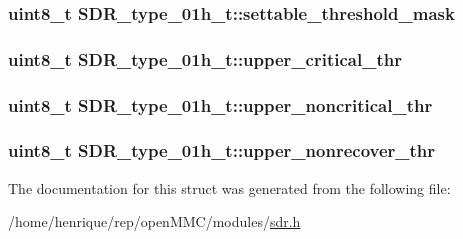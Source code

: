 \hypertarget{structSDR__type__01h__t_ac5b87fdae3ca9a1e52938e333b2a3eb7}{
\subsubsection[{settable\-\_\-threshold\-\_\-mask}]{\setlength{\rightskip}{0pt plus 5cm}uint8\-\_\-t S\-D\-R\-\_\-type\-\_\-01h\-\_\-t\-::settable\-\_\-threshold\-\_\-mask}}\label{structSDR__type__01h__t_ac5b87fdae3ca9a1e52938e333b2a3eb7}
\hypertarget{structSDR__type__01h__t_ac3ebe764adbc5470f3fccb7ea4ae3f57}{
\subsubsection[{upper\-\_\-critical\-\_\-thr}]{\setlength{\rightskip}{0pt plus 5cm}uint8\-\_\-t S\-D\-R\-\_\-type\-\_\-01h\-\_\-t\-::upper\-\_\-critical\-\_\-thr}}\label{structSDR__type__01h__t_ac3ebe764adbc5470f3fccb7ea4ae3f57}
\hypertarget{structSDR__type__01h__t_aaca8ed979cdd5f27242eb009a23e0ea6}{
\subsubsection[{upper\-\_\-noncritical\-\_\-thr}]{\setlength{\rightskip}{0pt plus 5cm}uint8\-\_\-t S\-D\-R\-\_\-type\-\_\-01h\-\_\-t\-::upper\-\_\-noncritical\-\_\-thr}}\label{structSDR__type__01h__t_aaca8ed979cdd5f27242eb009a23e0ea6}
\hypertarget{structSDR__type__01h__t_a1a90d55b827420ba0c40706923f9b1a3}{
\subsubsection[{upper\-\_\-nonrecover\-\_\-thr}]{\setlength{\rightskip}{0pt plus 5cm}uint8\-\_\-t S\-D\-R\-\_\-type\-\_\-01h\-\_\-t\-::upper\-\_\-nonrecover\-\_\-thr}}\label{structSDR__type__01h__t_a1a90d55b827420ba0c40706923f9b1a3}


The documentation for this struct was generated from the following file\-:\begin{DoxyCompactItemize}
\item 
/home/henrique/rep/open\-M\-M\-C/modules/\hyperlink{sdr_8h}{sdr.\-h}\end{DoxyCompactItemize}
